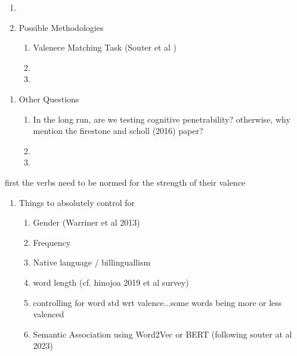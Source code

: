 \documentclass[12pt,letterpaper,table,svgnames,dvipsnames]{article}
\begin{document}
\begin{enumerate}[noitemsep]
    \item 

    \item Possible Methodologies
        \begin{enumerate}[noitemsep]
            \item Valenece Matching Task (Souter et al )
            \item 
            \item 
        \end{enumerate}
\end{enumerate}





\begin{enumerate}[noitemsep]
    \item Other Questions
        \begin{enumerate}[noitemsep]
            \item In the long run, are we testing cognitive penetrability? otherwise, why mention the firestone and scholl (2016) paper?
            \item 
            \item 
        \end{enumerate}
\end{enumerate}

first the verbs need to be normed for the strength of their valence

\begin{enumerate}[noitemsep]
    \item Things to absolutely control for
        \begin{enumerate}[noitemsep]
            \item Gender (Warriner et al 2013)
            \item Frequency
            \item Native language  /  billinguallism
            \item word length (cf. hinojoa 2019 et al survey)
            \item controlling for word std wrt valence...some words being more or less valenced 
            \item Semantic Association using Word2Vec or BERT (following souter at al 2023)


        \end{enumerate}
\end{enumerate}
\end{document}
